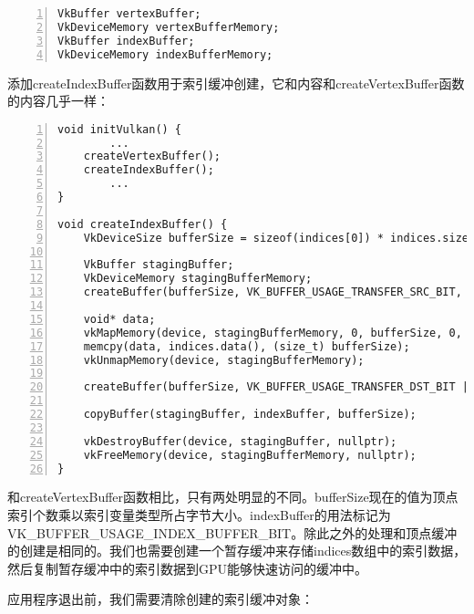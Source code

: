 \documentclass{ctexart}
\begin{document}
\begin{lstlisting}[language={[ANSI]C},keywordstyle=\color{blue!70},commentstyle=\color{red!50!green!50!blue!50},frame=shadowbox, rulesepcolor=\color{red!20!green!20!blue!20},basicstyle=\small,numbers=left, numberstyle=\tiny,breaklines=true]
VkBuffer vertexBuffer;
VkDeviceMemory vertexBufferMemory;
VkBuffer indexBuffer;
VkDeviceMemory indexBufferMemory;
\end{lstlisting}

添加createIndexBuffer函数用于索引缓冲创建，它和内容和createVertexBuffer函数的内容几乎一样：

\begin{lstlisting}[language={[ANSI]C},keywordstyle=\color{blue!70},commentstyle=\color{red!50!green!50!blue!50},frame=shadowbox, rulesepcolor=\color{red!20!green!20!blue!20},basicstyle=\small,numbers=left, numberstyle=\tiny,breaklines=true]
void initVulkan() {
		...
	createVertexBuffer();
	createIndexBuffer();
		...
}

void createIndexBuffer() {
	VkDeviceSize bufferSize = sizeof(indices[0]) * indices.size();

	VkBuffer stagingBuffer;
	VkDeviceMemory stagingBufferMemory;
	createBuffer(bufferSize, VK_BUFFER_USAGE_TRANSFER_SRC_BIT, VK_MEMORY_PROPERTY_HOST_VISIBLE_BIT | VK_MEMORY_PROPERTY_HOST_COHERENT_BIT, stagingBuffer, stagingBufferMemory);

	void* data;
	vkMapMemory(device, stagingBufferMemory, 0, bufferSize, 0, &data);
	memcpy(data, indices.data(), (size_t) bufferSize);
	vkUnmapMemory(device, stagingBufferMemory);

	createBuffer(bufferSize, VK_BUFFER_USAGE_TRANSFER_DST_BIT | VK_BUFFER_USAGE_INDEX_BUFFER_BIT, VK_MEMORY_PROPERTY_DEVICE_LOCAL_BIT, indexBuffer, indexBufferMemory);

	copyBuffer(stagingBuffer, indexBuffer, bufferSize);

	vkDestroyBuffer(device, stagingBuffer, nullptr);
	vkFreeMemory(device, stagingBufferMemory, nullptr);
}
\end{lstlisting}

和createVertexBuffer函数相比，只有两处明显的不同。bufferSize现在的值为顶点索引个数乘以索引变量类型所占字节大小。indexBuffer的用法标记为VK\_BUFFER\_USAGE\_INDEX\_BUFFER\_BIT。除此之外的处理和顶点缓冲的创建是相同的。我们也需要创建一个暂存缓冲来存储indices数组中的索引数据，然后复制暂存缓冲中的索引数据到GPU能够快速访问的缓冲中。

应用程序退出前，我们需要清除创建的索引缓冲对象：
\end{document}
